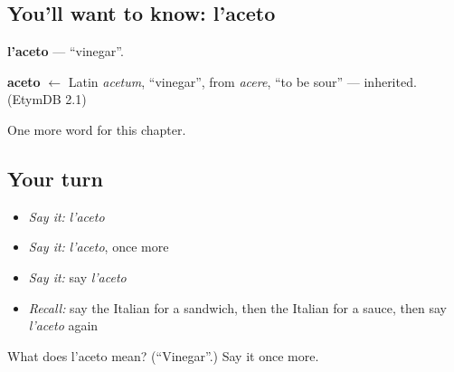 \subsection*{You'll want to know: l'aceto}
\textbf{l'aceto} — \textquotedblleft{}vinegar\textquotedblright{}.

\begin{cousinweb}
\textbf{aceto} $\leftarrow$ Latin \emph{acetum}, \textquotedblleft{}vinegar\textquotedblright{}, from \emph{acere}, \textquotedblleft{}to be sour\textquotedblright{} — inherited. (EtymDB 2.1)
\end{cousinweb}

\begin{grammarlens}[title={What you've built}]
One more word for this chapter.
\end{grammarlens}

\subsection*{Your turn}
\begin{itemize}
\raggedright
  \item \emph{Say it:} \emph{l'aceto}
  \item \emph{Say it:} \emph{l'aceto}, once more
  \item \emph{Say it:} say \emph{l'aceto}
  \item \emph{Recall:} say the Italian for a sandwich, then the Italian for a sauce, then say \emph{l'aceto} again
\end{itemize}

\begin{tcolorbox}[breakable,colback=teal!4,colframe=teal!35!black,title={Before you move on}]
What does l'aceto mean? (\textquotedblleft{}Vinegar\textquotedblright{}.) Say it once more.
\end{tcolorbox}
